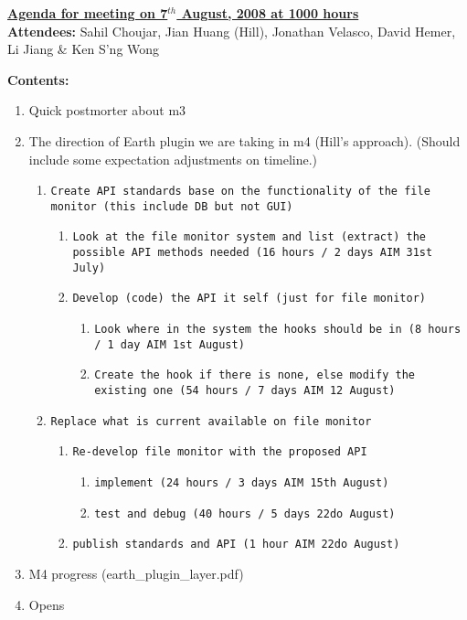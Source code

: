 \documentclass{letter}
\begin{document}
{\large \textbf{\underline{Agenda for meeting on 7$^{th}$ August, 2008 at 1000 hours}}}\\

\textbf{Attendees:} Sahil Choujar, Jian Huang (Hill), Jonathan Velasco, David Hemer, Li Jiang \& Ken S'ng Wong

\textbf{Contents:}

\begin{enumerate}
	\item Quick postmorter about m3 
	\item The direction of Earth plugin we are taking in m4 (Hill's approach). (Should include  some expectation adjustments on timeline.)

			\begin{enumerate}
			\item \texttt{Create API standards base on the functionality of the file monitor (this include DB but not GUI)}
			\begin{enumerate}
			\item \texttt{Look at the file monitor system and list (extract) the possible API methods needed (16 hours / 2 days AIM 31st July)}
			\item \texttt{Develop (code) the API it self (just for file monitor) }
			\begin{enumerate}
			\item \texttt{Look where in the system the hooks should be in (8 hours / 1 day AIM 1st August)}
			\item \texttt{Create the hook if there is none, else modify the existing one (54 hours / 7 days AIM 12 August)}
			\end{enumerate}
			\end{enumerate}
			\item \texttt{Replace what is current available on file monitor }
			\begin{enumerate}
			\item \texttt{Re-develop file monitor with the proposed API }%
			\begin{enumerate}
			\item \texttt{implement (24 hours / 3 days AIM 15th August)}
			\item \texttt{test and debug (40 hours / 5 days 22do August)}
			\end{enumerate}
			\item \texttt{publish standards and API (1 hour AIM 22do August)}
			\end{enumerate}
			\end{enumerate}


	\item M4 progress (earth\_plugin\_layer.pdf)
	\item Opens
\end{enumerate}
 
\end{document}
